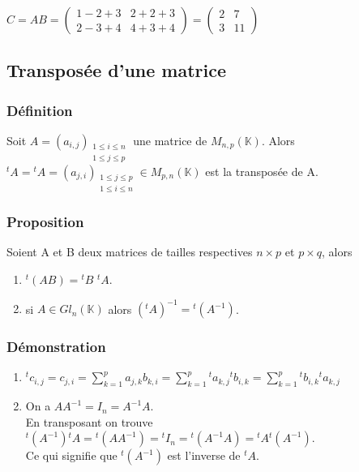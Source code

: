 \documentclass[a4paper,10pt]{book} %
\newcommand{\K}{\mathbb{K}}
\begin{document}
$C=AB=\begin{pmatrix}
1-2+3 & 2+2+3 \\
2-3+4 & 4+3+4
\end{pmatrix}=\begin{pmatrix}
2 & 7 \\ 3 & 11
\end{pmatrix}$

\newpage

\subsection{Transposée d'une matrice}
\subsubsection{Définition}
Soit $A=(a_{i,j})_{\substack{1 \leq i \leq n \\ 1\leq j \leq p}}$ une matrice de $M_{n,p}(\K)$. Alors ${}^{t}A={}^{t}A=(a_{j,i})_{\substack{1 \leq j \leq p \\ 1\leq i \leq n}}\in M_{p,n}(\K)$ est la transposée de A.

\subsubsection{Proposition}
Soient A et B deux matrices de tailles respectives $n\times p$ et $p\times q$, alors
\begin{enumerate} \item ${}^{t}(AB)={}^{t}B$ ${}^{t}A$.
\item si $A\in Gl_n(\K)$ alors $({}^tA)^{-1}={}^t(A^{-1})$.
\end{enumerate}

\subsubsection{Démonstration}
\begin{enumerate} \item  ${}^{t}c_{i,j}=c_{j,i}=\sum\limits_{k=1}^{p}a_{j,k}b_{k,i}=\sum\limits_{k=1}^{p}{}^{t}a_{k,j}{}^{t}b_{i,k}=\sum\limits_{k=1}^{p}{}^{t}b_{i,k}{}^{t}a_{k,j}$
\item On a $AA^{-1}=I_n=A^{-1}A$.\\
En transposant on trouve ${}^t(A^{-1}){}^{t}A={}^t(AA^{-1})={}^{t}I_n={}^t(A^{-1}A)={}^tA{}^t(A^{-1})$.\\

Ce qui signifie que ${}^t(A^{-1})$ est l'inverse de ${}^tA$.

\end{enumerate}
\end{document}
